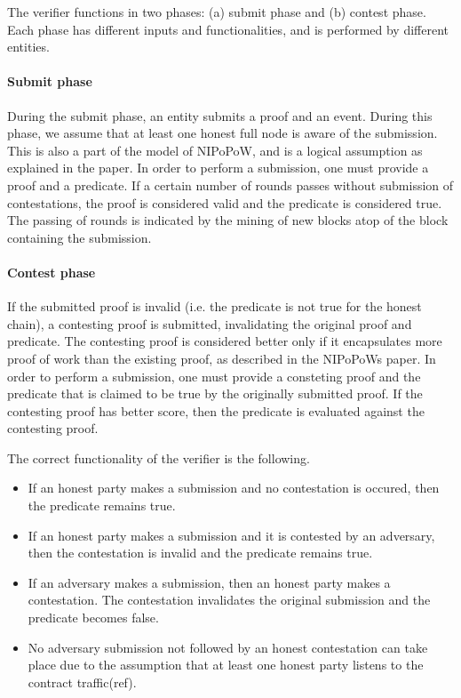 \documentclass{article}
\begin{document}
  The verifier functions in two phases: (a) submit phase and (b) contest
  phase. Each phase has different inputs and functionalities, and is
  performed by different entities.

  \paragraph{Submit phase} During the submit phase, an entity submits a
  proof and an event. During this phase, we assume that at least one
  honest full node is aware of the submission. This is also a part of
  the model of NIPoPoW, and is a logical assumption as explained in the
  paper. In order to perform a submission, one must provide a proof and
  a predicate. If a certain number of rounds passes without submission
  of contestations, the proof is considered valid and the predicate is
  considered true. The passing of rounds is indicated by the mining of
  new blocks atop of the block containing the submission.

  \paragraph{Contest phase} If the submitted proof is invalid (i.e. the
  predicate is not true for the honest chain), a contesting proof is
  submitted, invalidating the original proof and predicate. The
  contesting proof is considered better only if it encapsulates more
  proof of work than the existing proof, as described in the NIPoPoWs
  paper. In order to perform a submission, one must provide a consteting
  proof and the predicate that is claimed to be true by the originally
  submitted proof. If the contesting proof has better score, then the
  predicate is evaluated against the contesting proof.

  The correct functionality of the verifier is the following.
  \begin{itemize}
  \item
    If an honest party makes a submission and no contestation is
    occured, then the predicate remains true.
  \item
    If an honest party makes a submission and it is contested by an
    adversary, then the contestation is invalid and the predicate
    remains true.
  \item
    If an adversary makes a submission, then an honest party makes a
    contestation. The contestation invalidates the original submission
    and the predicate becomes false.
  \item
    No adversary submission not followed by an honest contestation can
    take place due to the assumption that at least one honest party
    listens to the contract traffic(ref).
  \end{itemize}
\end{document}
